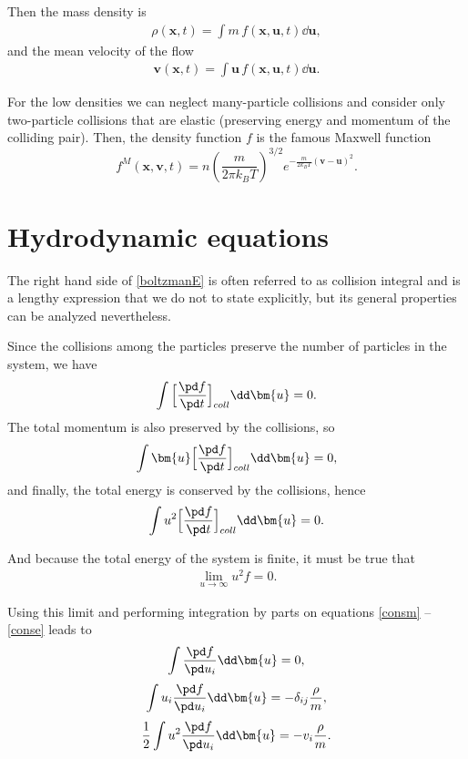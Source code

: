 Then the mass density is
\begin{align} \label{densb}
\rho(\bm{x},t) = \int m \, f(\bm{x,u},t) \dd \bm{u},
\end{align}
and the mean velocity of the flow
\begin{align} \label{meanv}
\bm{v}(\bm{x},t) = \int \bm{u} \, f(\bm{x,u},t) \dd \bm{u}.
\end{align}

For the low densities we can neglect many-particle collisions and  consider only two-particle collisions that are elastic (preserving energy and momentum of the colliding pair).
Then, the density function $f$ is the famous Maxwell function
\begin{equation} \label{Maxwell}
f^M(\bm{x,v,}t) = n(\frac{m}{2 \pi k_B T})^{3/2} e^{-\frac{m}{2k_B T}(\bm{v-u})^2}.
\end{equation}

\section{Hydrodynamic equations}
The right hand side of \ref{boltzmanE} is often referred to as collision integral and is a lengthy expression that we do not to state explicitly, but its general properties can be analyzed nevertheless.

Since the collisions among the particles preserve the number of particles in the system, we have
\begin{align} \label{consm}
\int \Big[\frac{\pd f}{\pd t} \Big]_{coll} \dd \bm{u} = 0.
\end{align}
The total momentum is also preserved by the collisions, so
\begin{align} \label{consmm}
\int \bm{u} \Big[\frac{\pd f}{\pd t} \Big]_{coll} \dd \bm{u} = 0,
\end{align}
and finally, the total energy is conserved by the collisions, hence
\begin{align} \label{conse}
\int u^2 \Big[\frac{\pd f}{\pd t} \Big]_{coll} \dd \bm{u} = 0.
\end{align}

And because the total energy of the system is finite, it must be true that
\begin{align} \label{lime}
\lim_{u \rightarrow \infty} u^2 f = 0.
\end{align}

Using this limit and performing integration by parts on equations \ref{consm} -- \ref{conse} leads to
\begin{align} \label{due}
\int \frac{\pd f}{\pd u_i} \dd \bm{u} = 0,
\end{align}
\begin{align} \label{due2}
\int u_i \frac{\pd f}{\pd u_i} \dd \bm{u} = -\delta_{ij} \frac{\rho}{m},
\end{align}
\begin{align}
\frac{1}{2} \int u^2 \frac{\pd f}{\pd u_i} \dd \bm{u} = - v_i \frac{\rho}{m}.
\end{align}


